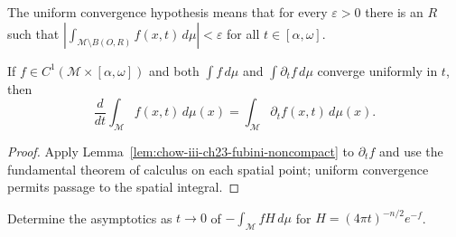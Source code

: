 \begin{remark}
\label{rem:chow-iii-ch23-fubini-tail}

The uniform convergence hypothesis means that for every $\varepsilon>0$ there
is an $R$ such that
\(\left|\int_{\mathcal M\setminus B(O,R)}f(x,t)\,d\mu\right|<\varepsilon\)
for all $t\in[\alpha,\omega]$.
\end{remark}

\begin{lemma}
\label{lem:chow-iii-ch23-differentiation-under-integral}

If $f\in C^1(\mathcal M\times[\alpha,\omega])$ and both
\(\int f\,d\mu\) and $\int\partial_tf\,d\mu$ converge uniformly in $t$, then
\[
\frac d{dt}\int_{\mathcal M}f(x,t)\,d\mu(x)
=\int_{\mathcal M}\partial_tf(x,t)\,d\mu(x).
\]
\end{lemma}
\begin{proof}
\sketch Apply Lemma~\ref{lem:chow-iii-ch23-fubini-noncompact} to $\partial_tf$ and use
the fundamental theorem of calculus on each spatial point; uniform convergence
permits passage to the spatial integral.
\end{proof}

\begin{example}
\label{ex:chow-iii-ch23-entropy-problem}
Determine the asymptotics as $t\to0$ of $-\int_{\mathcal M}fH\,d\mu$ for
$H=(4\pi t)^{-n/2}e^{-f}$.
\end{example}
